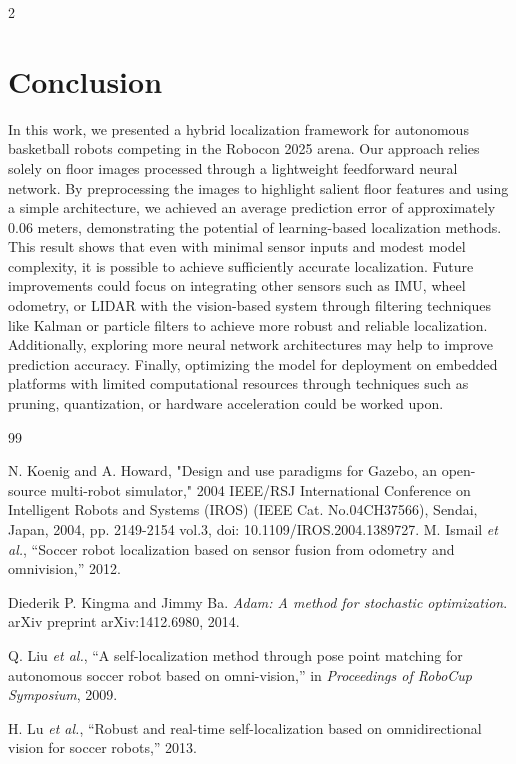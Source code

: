 \documentclass[a4paper]{article}
\begin{document}
\begin{multicols}{2}
\section{Conclusion}  
\par \noindent
In this work, we presented a hybrid localization framework for autonomous basketball robots competing 
in the Robocon 2025 arena.
Our approach relies solely on floor images processed through a lightweight
feedforward neural network.
By preprocessing the images to highlight salient floor features and using a simple architecture, 
we achieved an average prediction error of approximately 0.06 meters, demonstrating the potential of 
learning-based localization methods.
This result shows that even with minimal sensor inputs and modest 
model complexity, it is possible to achieve sufficiently accurate localization.
Future improvements could 
focus on integrating other sensors such as IMU, wheel odometry, or LIDAR with the vision-based system 
through filtering techniques like Kalman or particle filters to achieve more robust and reliable 
localization.
Additionally, exploring more neural network architectures may help to improve prediction 
accuracy.
Finally, optimizing the model for deployment on embedded platforms with limited computational
resources through techniques such as pruning, quantization, or hardware acceleration could be worked upon.

\begin{thebibliography}{99}

N. Koenig and A. Howard, "Design and use paradigms for Gazebo, an open-source 
multi-robot simulator," 2004 IEEE/RSJ International Conference on Intelligent Robots 
and Systems (IROS) (IEEE Cat. No.04CH37566), Sendai, Japan, 2004, pp. 2149-2154 vol.3, 
doi: 10.1109/IROS.2004.1389727.
M. Ismail \textit{et al.}, ``Soccer robot localization based on sensor fusion from odometry and omnivision,'' 2012.

Diederik P. Kingma and Jimmy Ba.
\textit{Adam: A method for stochastic optimization}. 
arXiv preprint arXiv:1412.6980, 2014.

Q. Liu \textit{et al.}, ``A self-localization method through pose point matching for autonomous soccer robot based on omni-vision,'' in \textit{Proceedings of RoboCup Symposium}, 2009.

H. Lu \textit{et al.}, ``Robust and real-time self-localization based on omnidirectional vision for soccer robots,'' 2013.


\end{thebibliography}
\end{multicols}
\end{document}
